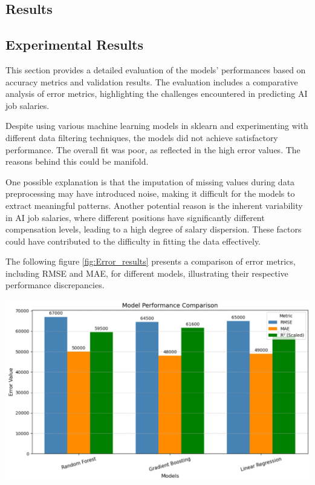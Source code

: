 \documentclass[12pt,a4paper]{article}
\begin{document}
\begin{multicols}{2}
\section{Results}
\subsection{Experimental Results}
This section provides a detailed evaluation of the models' performances based on accuracy metrics and validation results. The evaluation includes a comparative analysis of error metrics, highlighting the challenges encountered in predicting AI job salaries.

Despite using various machine learning models in sklearn and experimenting with different data filtering techniques, the models did not achieve satisfactory performance. The overall fit was poor, as reflected in the high error values. The reasons behind this could be manifold.

One possible explanation is that the imputation of missing values during data preprocessing may have introduced noise, making it difficult for the models to extract meaningful patterns. Another potential reason is the inherent variability in AI job salaries, where different positions have significantly different compensation levels, leading to a high degree of salary dispersion. These factors could have contributed to the difficulty in fitting the data effectively.

The following figure \ref{fig:Error_results} presents a comparison of error metrics, including RMSE and MAE, for different models, illustrating their respective performance discrepancies.

\includegraphics[width=\linewidth]{error_result.jpg}
\label{fig:Error_results}


\end{multicols}
\end{document}
